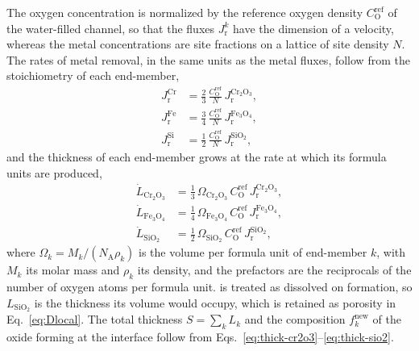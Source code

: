 \documentclass[3p,times]{elsarticle} %
\newcommand{\Ox}{\mathrm{O}}           %
\begin{document}
The oxygen concentration is normalized by the reference oxygen density
\(C_{\Ox}^{\mathrm{ref}}\) of the water-filled channel, so that the fluxes
\(J_{\mathrm{r}}^{k}\) have the dimension of a velocity, whereas the metal
concentrations are site fractions on a lattice of site density \(N\). The
rates of metal removal, in the same units as the metal fluxes, follow from
the stoichiometry of each end-member,
\begin{align}
J_{\mathrm{r}}^{\mathrm{Cr}}
 &= \tfrac{2}{3}\,\frac{C_{\Ox}^{\mathrm{ref}}}{N}\,J_{\mathrm{r}}^{\mathrm{Cr_2O_3}},
\label{eq:sink-cr}\\
J_{\mathrm{r}}^{\mathrm{Fe}}
 &= \tfrac{3}{4}\,\frac{C_{\Ox}^{\mathrm{ref}}}{N}\,J_{\mathrm{r}}^{\mathrm{Fe_3O_4}},
\label{eq:sink-fe}\\
J_{\mathrm{r}}^{\mathrm{Si}}
 &= \tfrac{1}{2}\,\frac{C_{\Ox}^{\mathrm{ref}}}{N}\,J_{\mathrm{r}}^{\mathrm{SiO_2}} ,
\label{eq:sink-si}
\end{align}
and the thickness of each end-member grows at the rate at which its formula
units are produced,
\begin{align}
\dot{L}_{\mathrm{Cr_2O_3}}
 &= \tfrac{1}{3}\,\Omega_{\mathrm{Cr_2O_3}}\,C_{\Ox}^{\mathrm{ref}}\,
    J_{\mathrm{r}}^{\mathrm{Cr_2O_3}},
\label{eq:thick-cr2o3}\\
\dot{L}_{\mathrm{Fe_3O_4}}
 &= \tfrac{1}{4}\,\Omega_{\mathrm{Fe_3O_4}}\,C_{\Ox}^{\mathrm{ref}}\,
    J_{\mathrm{r}}^{\mathrm{Fe_3O_4}},
\label{eq:thick-fe3o4}\\
\dot{L}_{\mathrm{SiO_2}}
 &= \tfrac{1}{2}\,\Omega_{\mathrm{SiO_2}}\,C_{\Ox}^{\mathrm{ref}}\,
    J_{\mathrm{r}}^{\mathrm{SiO_2}},
\label{eq:thick-sio2}
\end{align}
where \(\Omega_k=M_k/(N_{\mathrm{A}}\rho_k)\) is the volume per formula unit
of end-member \(k\), with \(M_k\) its molar mass and \(\rho_k\) its density,
and the prefactors are the reciprocals of the number of oxygen atoms per
formula unit.  is treated as dissolved on formation, so
\(L_{\mathrm{SiO_2}}\) is the thickness its volume would occupy, which is
retained as porosity in Eq.~\eqref{eq:Dlocal}. The total thickness
\(S=\sum_k L_k\) and the composition \(f_k^{\mathrm{new}}\) of the oxide
forming at the interface follow from
Eqs.~\eqref{eq:thick-cr2o3}--\eqref{eq:thick-sio2}.
\end{document}
